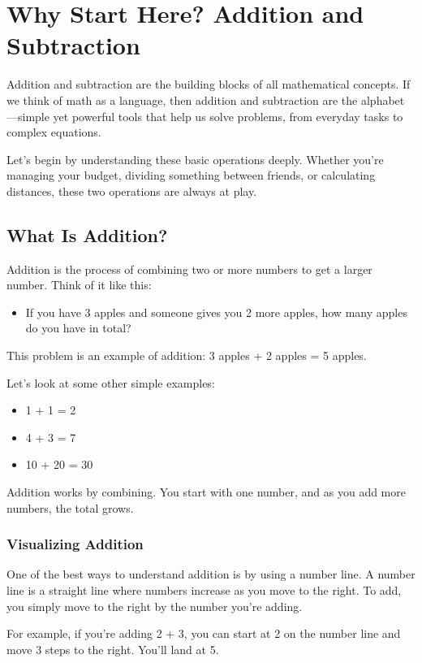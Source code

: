 \chapter{Why Start Here? Addition and Subtraction}

Addition and subtraction are the building blocks of all mathematical concepts. If we think of math as a language, then addition and subtraction are the alphabet—simple yet powerful tools that help us solve problems, from everyday tasks to complex equations.

Let’s begin by understanding these basic operations deeply. Whether you’re managing your budget, dividing something between friends, or calculating distances, these two operations are always at play.


\section{What Is Addition?}
Addition is the process of combining two or more numbers to get a larger number. Think of it like this:
\begin{itemize}
    \item If you have 3 apples and someone gives you 2 more apples, how many apples do you have in total?
\end{itemize}
This problem is an example of addition: 3 apples + 2 apples = 5 apples.

Let’s look at some other simple examples:
\begin{itemize}
    \item 1 + 1 = 2
    \item 4 + 3 = 7
    \item 10 + 20 = 30
\end{itemize}

Addition works by combining. You start with one number, and as you add more numbers, the total grows.

\subsection{Visualizing Addition}
One of the best ways to understand addition is by using a number line. A number line is a straight line where numbers increase as you move to the right. To add, you simply move to the right by the number you're adding.

For example, if you’re adding 2 + 3, you can start at 2 on the number line and move 3 steps to the right. You’ll land at 5.

\begin{center}
    \end{center}

